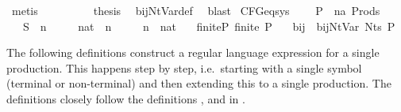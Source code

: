 \begin{isabellebody}
\ metis\isanewline
\ \ \isamarkupfalse%
\ {}\ {}\ {}\ {}\ \isamarkupfalse%
\ {\isacharquery}{\kern0pt}thesis\ \isamarkupfalse%
\ bij{\isacharunderscore}{\kern0pt}Nt{\isacharunderscore}{\kern0pt}Var{\isacharunderscore}{\kern0pt}def\ \isamarkupfalse%
\ blast\isanewline
{}\isamarkupfalse%
%
\endisatagproof
{\isafoldproof}%
%
\isadelimproof
\isanewline
%
\endisadelimproof
\isanewline
\isanewline
{}\isamarkupfalse%
\ CFG{\isacharunderscore}{\kern0pt}eq{\isacharunderscore}{\kern0pt}sys\ {\isacharequal}{\kern0pt}\isanewline
\ \ \ P\ {\isacharcolon}{\kern0pt}{\isacharcolon}{\kern0pt}\ {\isachardoublequoteopen}{\isacharparenleft}{\kern0pt}{\isacharprime}{\kern0pt}n{\isacharcomma}{\kern0pt}{\isacharprime}{\kern0pt}a{\isacharparenright}{\kern0pt}\ Prods{\isachardoublequoteclose}\isanewline
\ \ \ S\ {\isacharcolon}{\kern0pt}{\isacharcolon}{\kern0pt}\ {\isacharprime}{\kern0pt}n\isanewline
\ \ \ {\isasymgamma}\ {\isacharcolon}{\kern0pt}{\isacharcolon}{\kern0pt}\ {\isachardoublequoteopen}nat\ {\isasymRightarrow}\ {\isacharprime}{\kern0pt}n{\isachardoublequoteclose}\isanewline
\ \ \ {\isasymgamma}{\isacharprime}{\kern0pt}\ {\isacharcolon}{\kern0pt}{\isacharcolon}{\kern0pt}\ {\isachardoublequoteopen}{\isacharprime}{\kern0pt}n\ {\isasymRightarrow}\ nat{\isachardoublequoteclose}\isanewline
\ \ \ finite{\isacharunderscore}{\kern0pt}P{\isacharcolon}{\kern0pt}\ {\isachardoublequoteopen}finite\ P{\isachardoublequoteclose}\isanewline
\ \ \ bij{\isacharunderscore}{\kern0pt}{\isasymgamma}{\isacharunderscore}{\kern0pt}{\isasymgamma}{\isacharprime}{\kern0pt}{\isacharcolon}{\kern0pt}\ \ {\isachardoublequoteopen}bij{\isacharunderscore}{\kern0pt}Nt{\isacharunderscore}{\kern0pt}Var\ {\isacharparenleft}{\kern0pt}Nts\ P{\isacharparenright}{\kern0pt}\ {\isasymgamma}\ {\isasymgamma}{\isacharprime}{\kern0pt}{\isachardoublequoteclose}\isanewline
{}%
\begin{isamarkuptext}%
The following definitions construct a regular language expression for a single production. This
happens step by step, i.e.\ starting with a single symbol (terminal or non-terminal) and then extending
this to a single production. The definitions closely follow the definitions ,
 and  in .%

\end{isamarkuptext}
\end{isabellebody}
